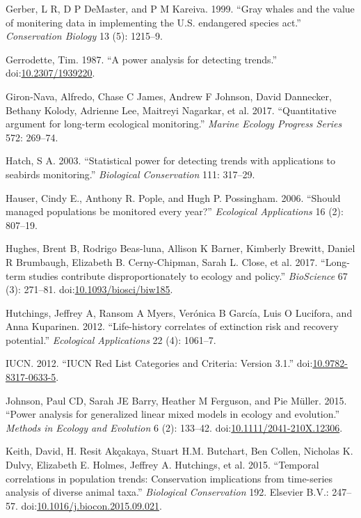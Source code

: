 \documentclass[12pt,]{article}
\begin{document}
\begin{spacing}{2}
\hypertarget{ref-Gerber1999}{}
Gerber, L R, D P DeMaster, and P M Kareiva. 1999. ``Gray whales and the
value of monitering data in implementing the U.S. endangered species
act.'' \emph{Conservation Biology} 13 (5): 1215--9.

\hypertarget{ref-Gerrodette1987}{}
Gerrodette, Tim. 1987. ``A power analysis for detecting trends.''
doi:\href{https://doi.org/10.2307/1939220}{10.2307/1939220}.

\hypertarget{ref-Giron-Nava2017}{}
Giron-Nava, Alfredo, Chase C James, Andrew F Johnson, David Dannecker,
Bethany Kolody, Adrienne Lee, Maitreyi Nagarkar, et al. 2017.
``Quantitative argument for long-term ecological monitoring.''
\emph{Marine Ecology Progress Series} 572: 269--74.

\hypertarget{ref-Hatch2003}{}
Hatch, S A. 2003. ``Statistical power for detecting trends with
applications to seabirds monitoring.'' \emph{Biological Conservation}
111: 317--29.

\hypertarget{ref-Hauser2006}{}
Hauser, Cindy E., Anthony R. Pople, and Hugh P. Possingham. 2006.
``Should managed populations be monitored every year?'' \emph{Ecological
Applications} 16 (2): 807--19.

\hypertarget{ref-Hughes2017}{}
Hughes, Brent B, Rodrigo Beas-luna, Allison K Barner, Kimberly Brewitt,
Daniel R Brumbaugh, Elizabeth B. Cerny-Chipman, Sarah L. Close, et al.
2017. ``Long-term studies contribute disproportionately to ecology and
policy.'' \emph{BioScience} 67 (3): 271--81.
doi:\href{https://doi.org/10.1093/biosci/biw185}{10.1093/biosci/biw185}.

\hypertarget{ref-Hutchings2012}{}
Hutchings, Jeffrey A, Ransom A Myers, Verónica B García, Luis O
Lucifora, and Anna Kuparinen. 2012. ``Life-history correlates of
extinction risk and recovery potential.'' \emph{Ecological Applications}
22 (4): 1061--7.

\hypertarget{ref-IUCN2012}{}
IUCN. 2012. ``IUCN Red List Categories and Criteria: Version 3.1.''
doi:\href{https://doi.org/10.9782-8317-0633-5}{10.9782-8317-0633-5}.

\hypertarget{ref-Johnson2015}{}
Johnson, Paul CD, Sarah JE Barry, Heather M Ferguson, and Pie Müller.
2015. ``Power analysis for generalized linear mixed models in ecology
and evolution.'' \emph{Methods in Ecology and Evolution} 6 (2): 133--42.
doi:\href{https://doi.org/10.1111/2041-210X.12306}{10.1111/2041-210X.12306}.

\hypertarget{ref-Keith2015}{}
Keith, David, H. Resit Akçakaya, Stuart H.M. Butchart, Ben Collen,
Nicholas K. Dulvy, Elizabeth E. Holmes, Jeffrey A. Hutchings, et al.
2015. ``Temporal correlations in population trends: Conservation
implications from time-series analysis of diverse animal taxa.''
\emph{Biological Conservation} 192. Elsevier B.V.: 247--57.
doi:\href{https://doi.org/10.1016/j.biocon.2015.09.021}{10.1016/j.biocon.2015.09.021}.


\end{spacing}
\end{document}
